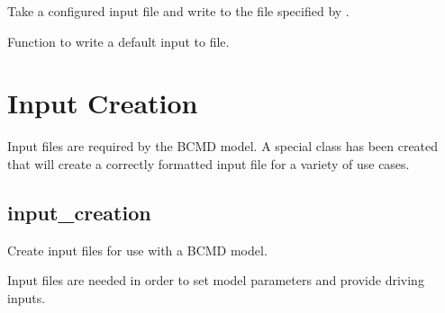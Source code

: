 \documentclass[letterpaper,10pt,english]{sphinxmanual}
\begin{document}
\begin{fulllineitems}
\begin{fulllineitems}
Take a configured input file and write to the file specified by
{\hyperref[\detokenize{bcmdModel:bayescmd.bcmdModel.bcmd_model.ModelBCMD.input_file}]{}}.

\end{fulllineitems}


\begin{fulllineitems}
\label{\detokenize{bcmdModel:bayescmd.bcmdModel.ModelBCMD.write_initialised_input}}
Function to write a default input to file.

\end{fulllineitems}


\end{fulllineitems}



\section{Input Creation}
\label{\detokenize{bcmdModel:input-creation}}
Input files are required by the BCMD model. A special class has been created
that will create a correctly formatted input file for a variety of use cases.


\subsection{input\_creation}
\label{\detokenize{bcmdModel:module-bayescmd.bcmdModel.input_creation}}\label{\detokenize{bcmdModel:id1}}
Create input files for use with a BCMD model.

Input files are needed in order to set model parameters and provide driving
inputs.
\end{document}
